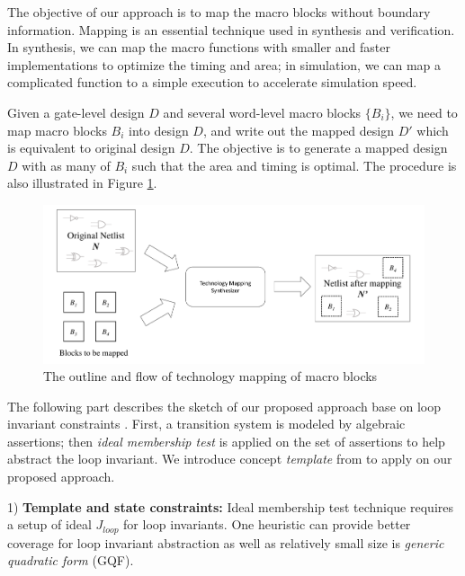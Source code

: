 \begin{Problem}
The objective of our approach is to map the macro blocks without boundary information.
Mapping is an essential technique used in synthesis and verification. In synthesis, we can map the 
macro functions with smaller and faster implementations to optimize the timing and area; in simulation,
we can map a complicated function to a simple execution to accelerate simulation speed.

Given a gate-level design $D$ and several word-level macro blocks $\{B_i\}$, we need to map macro
blocks $B_i$ into design $D$, and write out the mapped design $D'$ which is equivalent to original
design $D$. The objective is to generate a mapped design $D$ with as many of $B_i$ such that the area
and timing is optimal. The procedure is also illustrated in Figure \ref{fig:macro}.

\begin{figure}[h]
	\begin{center}
	\includegraphics[width=\textwidth]{newfig/macro.pdf}
	\end{center}
	\caption{The outline and flow of technology mapping of macro blocks}
	\label{fig:macro}
\end{figure}

\end{Problem}

The following part describes the sketch of our proposed approach base on loop invariant constraints \cite{sankaranarayanan2004non}.
First, a transition system is modeled by algebraic assertions; then \emph{ideal membership test} \cite{lv:phd}
is applied on the set of assertions to help abstract the loop invariant. We introduce concept \emph{template}
from \cite{sankaranarayanan2004non} to apply on our proposed approach.

1) {\bf Template and state constraints:}  Ideal membership test technique requires a setup of ideal $J_{loop}$
for loop invariants. 
One heuristic can provide better coverage for loop invariant abstraction as well as
relatively small size is \emph{generic quadratic form} (GQF).

